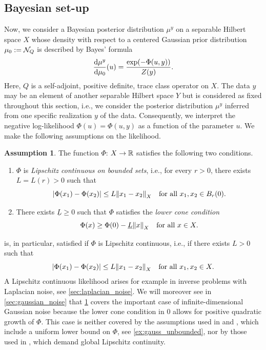 \documentclass[english]{jnsao}
\theoremstyle{definition}
\newtheorem{assumption}[theorem]{Assumption}
\begin{document}
\subsection{Bayesian set-up}

Now, we consider a Bayesian posterior distribution $\mu^y$ on a separable Hilbert space $X$ whose density with respect to a centered Gaussian prior distribution $\mu_0 := \mathcal{N}_Q$ is described by Bayes' formula
\begin{equation}
	\frac{\mathrm{d}\mu^y}{\mathrm{d}\mu_0}(u) = \frac{\exp(-\Phi(u,y))}{Z(y)}.
	\label{post_dist}
\end{equation}
Here, $Q$ is a self-adjoint, positive definite, trace class operator on $X$.
The data $y$ may be an element of another separable Hilbert space $Y$ but is considered as fixed throughout this section, i.e., we consider the posterior distribution $\mu^y$ inferred from one specific realization $y$ of the data. Consequently, we interpret the negative log-likelihood $\Phi(u) = \Phi(u,y)$ as a function of the parameter $u$. We make the following assumptions on the likelihood.
\begin{assumption}
	\label{ass:phi}
	The function $\Phi$: $X \to {\mathbb{R}}$ satisfies the following two conditions.
	\begin{enumerate}
		\item \label{ass:phi_loc_lip} $\Phi$ is \emph{Lipschitz continuous on bounded sets}, i.e., for every $r > 0$, there exists $L = L(r) > 0$ such that
		\[ {\lvert\Phi(x_1) - \Phi(x_2)\rvert} \le L {\lVert x_1 - x_2\rVert}_X \quad \text{for all}~x_1, x_2 \in B_r(0). \]
		\item \label{ass:phi_lower_bound} There exists $\underline{L} \ge 0$ such that $\Phi$ satisfies the \emph{lower cone condition}
		\[ \Phi(x) \ge \Phi(0) - \underline{L}{\lVert x\rVert}_X \quad \text{for all}~x \in X. \]
	\end{enumerate}
\end{assumption}

 is, in particular, satisfied if $\Phi$ is Lipschitz continuous, i.e., if there exists $L > 0$ such that
\[ {\lvert\Phi(x_1) - \Phi(x_2)\rvert} \le L{\lVert x_1 - x_2\rVert}_X \quad \text{for all}~x_1, x_2 \in X. \]
A Lipschitz continuous likelihood arises for example in inverse problems with Laplacian noise, see \cref{sec:laplacian_noise}.
We will moreover see in \cref{sec:gaussian_noise} that \cref{ass:phi} covers the important case of infinite-dimensional Gaussian noise because the lower cone condition in $0$ allows for positive quadratic growth of $\Phi$. This case is neither covered by the assumptions used in \cite{Dashti:2013} and \cite{klebanov2022}, which include a uniform lower bound on $\Phi$, see \cref{ex:gauss_unbounded}, nor by those used in \cite{Kretschmann:2019}, which demand global Lipschitz continuity.
\end{document}
